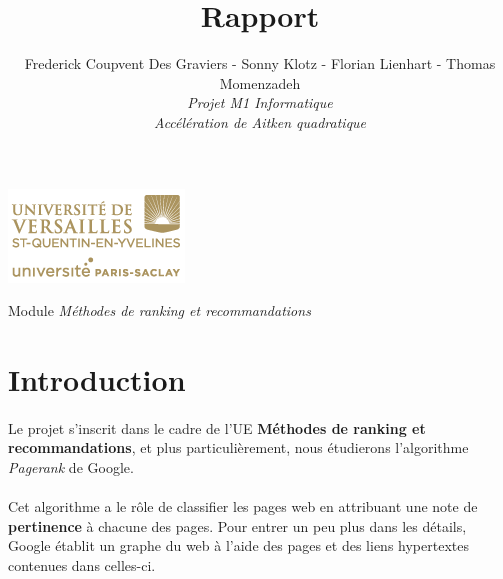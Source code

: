 
\usepackage[french,frenchkw,ruled,vlined]{../texLib/algorithm2e}

\title{\vspace{\fill}\textbf{\Huge Rapport}}
\author{
	Frederick Coupvent Des Graviers - Sonny Klotz - Florian Lienhart - Thomas Momenzadeh
	\vspace{2em}\\
	\textit{Projet M1 Informatique}\\\textit{Accélération de Aitken quadratique}
	\vspace{2em}
}



\clearpage
\maketitle\vspace{9em}
\begin{center}\includegraphics[scale=0.7]{logo.png}\end{center}
\begin{flushright}Module \textit{Méthodes de ranking et recommandations}\end{flushright}

\newpage
\tableofcontents

\newpage\clearpage{}

	\section*{Introduction}
		\paragraph{}Le projet s'inscrit dans le cadre de l'UE \textbf{Méthodes de ranking et recommandations}, et plus particulièrement, nous étudierons l'algorithme \textit{Pagerank} de Google.
		\paragraph{}Cet algorithme a le rôle de classifier les pages web en attribuant une note de \textbf{pertinence} à chacune des pages. Pour entrer un peu plus dans les détails, Google établit un graphe du web à l'aide des pages et des liens hypertextes contenues dans celles-ci.
